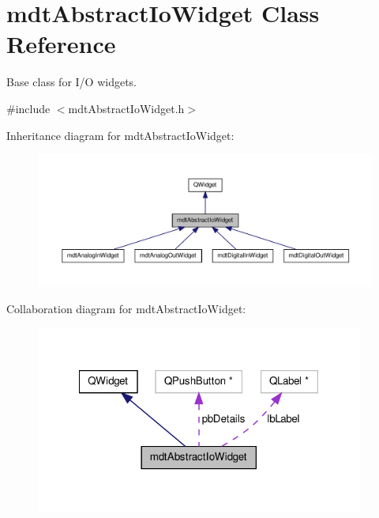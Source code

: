\hypertarget{classmdt_abstract_io_widget}{\section{mdt\-Abstract\-Io\-Widget Class Reference}
\label{classmdt_abstract_io_widget}
}


Base class for I/\-O widgets.  




{\ttfamily \#include $<$mdt\-Abstract\-Io\-Widget.\-h$>$}



Inheritance diagram for mdt\-Abstract\-Io\-Widget\-:\nopagebreak
\begin{figure}[H]
\begin{center}
\leavevmode
\includegraphics[width=350pt]{classmdt_abstract_io_widget__inherit__graph}
\end{center}
\end{figure}


Collaboration diagram for mdt\-Abstract\-Io\-Widget\-:\nopagebreak
\begin{figure}[H]
\begin{center}
\leavevmode
\includegraphics[width=306pt]{classmdt_abstract_io_widget__coll__graph}
\end{center}
\end{figure}
